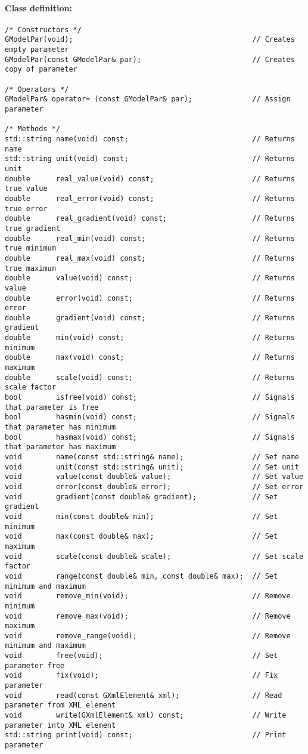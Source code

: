 \documentclass{article}[12pt,a4]
\begin{document}
\paragraph{Class definition:}
\begin{verbatim}
/* Constructors */
GModelPar(void);                                          // Creates empty parameter
GModelPar(const GModelPar& par);                          // Creates copy of parameter

/* Operators */
GModelPar& operator= (const GModelPar& par);              // Assign parameter

/* Methods */
std::string name(void) const;                             // Returns name
std::string unit(void) const;                             // Returns unit
double      real_value(void) const;                       // Returns true value
double      real_error(void) const;                       // Returns true error
double      real_gradient(void) const;                    // Returns true gradient
double      real_min(void) const;                         // Returns true minimum
double      real_max(void) const;                         // Returns true maximum
double      value(void) const;                            // Returns value
double      error(void) const;                            // Returns error
double      gradient(void) const;                         // Returns gradient
double      min(void) const;                              // Returns minimum
double      max(void) const;                              // Returns maximum
double      scale(void) const;                            // Returns scale factor
bool        isfree(void) const;                           // Signals that parameter is free
bool        hasmin(void) const;                           // Signals that parameter has minimum
bool        hasmax(void) const;                           // Signals that parameter has maximum
void        name(const std::string& name);                // Set name
void        unit(const std::string& unit);                // Set unit
void        value(const double& value);                   // Set value
void        error(const double& error);                   // Set error
void        gradient(const double& gradient);             // Set gradient
void        min(const double& min);                       // Set minimum
void        max(const double& max);                       // Set maximum
void        scale(const double& scale);                   // Set scale factor
void        range(const double& min, const double& max);  // Set minimum and maximum
void        remove_min(void);                             // Remove minimum
void        remove_max(void);                             // Remove maximum
void        remove_range(void);                           // Remove minimum and maximum
void        free(void);                                   // Set parameter free
void        fix(void);                                    // Fix parameter
void        read(const GXmlElement& xml);                 // Read parameter from XML element
void        write(GXmlElement& xml) const;                // Write parameter into XML element
std::string print(void) const;                            // Print parameter
\end{verbatim}
\end{document}
